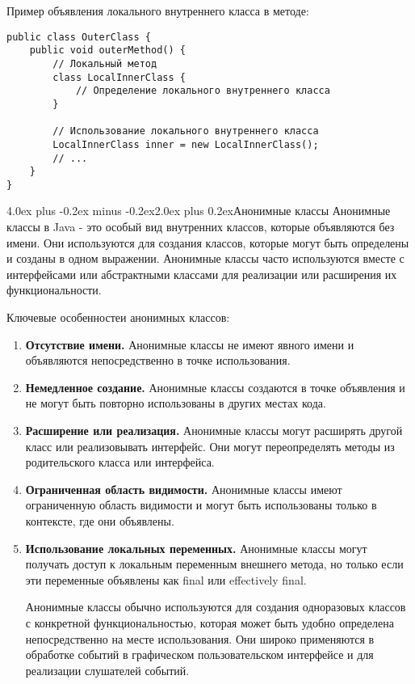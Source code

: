 \documentclass[12pt, a4paper]{book}%
\makeatletter
\renewcommand{\section}{\@startsection{section}{1}{1pt}%
{4.0ex plus -0.2ex minus -0.2ex}{2.0ex plus 0.2ex}{\centering\bf}}%
\makeatother
\begin{document}
{Пример объявления локального внутреннего класса в методе:

\begin{lstlisting}
public class OuterClass {
    public void outerMethod() {
        // Локальный метод
        class LocalInnerClass {
            // Определение локального внутреннего класса
        }
        
        // Использование локального внутреннего класса
        LocalInnerClass inner = new LocalInnerClass();
        // ...
    }
}
\end{lstlisting}

\section{Анонимные классы}
Анонимные классы в Java - это особый вид внутренних классов, которые объявляются без имени. Они используются для создания классов, которые могут быть определены и созданы в одном выражении. Анонимные классы часто используются вместе с интерфейсами или абстрактными классами для реализации или расширения их функциональности.

Ключевые особенностеи анонимных классов:

\begin{enumerate}
\item {\bf Отсутствие имени.}
Анонимные классы не имеют явного имени и объявляются непосредственно в точке использования.

\item {\bf Немедленное создание.}
Анонимные классы создаются в точке объявления и не могут быть повторно использованы в других местах кода.

\item {\bf Расширение или реализация.}
Анонимные классы могут расширять другой класс или реализовывать интерфейс. Они могут переопределять методы из родительского класса или интерфейса.

\item {\bf Ограниченная область видимости.}
Анонимные классы имеют ограниченную область видимости и могут быть использованы только в контексте, где они объявлены.

\item {\bf Использование локальных переменных.}
Анонимные классы могут получать доступ к локальным переменным внешнего метода, но только если эти переменные объявлены как final или effectively final.

Анонимные классы обычно используются для создания одноразовых классов с конкретной функциональностью, которая может быть удобно определена непосредственно на месте использования. Они широко применяются в обработке событий в графическом пользовательском интерфейсе и для реализации слушателей событий.


\end{enumerate}}
\end{document}
